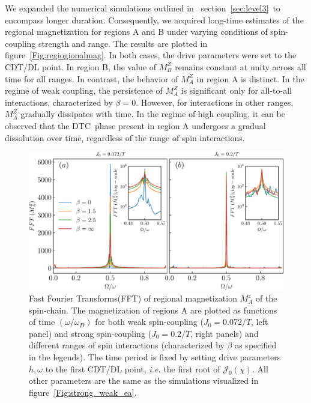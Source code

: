 \documentclass[12pt]{iopart}
\begin{document}
We expanded the numerical simulations outlined in  section~\ref{sec:level3} to encompass longer duration. Consequently, we acquired long-time estimates of the regional magnetization for regions A and B under varying conditions of spin-coupling strength and range. The results are plotted in figure~\ref{Fig:regiogionalmag}. In both cases, the drive parameters were set to the CDT/DL point. In region B, the value of $M^Z_B$ remains constant at unity across all time for all ranges. In contrast, the behavior of $M^Z_A$ in region A is distinct. In the regime of weak coupling, the persistence of $M^Z_A$ is significant only for all-to-all interactions, characterized by $\beta=0$. However, for interactions in other ranges, $M^Z_A$ gradually dissipates with time. In the regime of high coupling, it can be observed that the DTC phase present in region A undergoes a gradual dissolution over time, regardless of the range of spin interactions. 
\begin{figure}[t]
	\centering
	\hspace{1.5cm}\includegraphics[width = 13cm]{figure9.pdf}
	\caption{
		Fast Fourier Transforms(FFT) of regional magnetization $M^z_{A}$ of the spin-chain. The magnetization of regions A are plotted as functions of time $(\omega/\omega_D)$ for both weak spin-coupling ($J_0=0.072/T$, left panel) and strong spin-coupling ($J_0=0.2/T$, right panels) and different ranges of spin interactions (characterized by $\beta$ as specified in the legends). The time period is fixed by setting drive parameters $h,\omega$ to the first CDT/DL point, \textit{i.e.} the first root of $\mathcal{J}_0(\chi)$. All other parameters are the same as the simulations visualized in figure~\ref{Fig:strong_weak_ea}.}
	\label{Fig:regionalFFT}
\end{figure}
\end{document}
